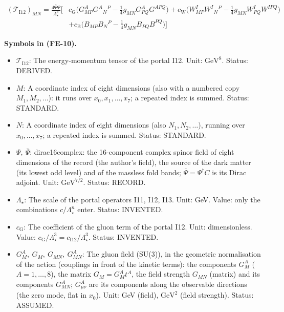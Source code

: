 \documentclass[
  10pt,
]{article}
\providecommand{\tightlist}{%
  \setlength{\itemsep}{0pt}\setlength{\parskip}{0pt}}
\begin{document}
\[
\begin{aligned}
(\mathcal{T}_{\mathrm{I12}})_{MN} =
 \frac{4\bar\Psi\Psi}{\Lambda_\star^3}\Big[&c_{\mathrm{G}}\Big(G^A_{MP}G^A{}_N{}^P
 - \frac14g_{MN}G^A_{PQ}G^{APQ}\Big) + c_{\mathrm{W}}\Big(W^I_{MP}W^I{}_N{}^P -
 \frac14g_{MN}W^I_{PQ}W^{IPQ}\Big)\\
 &+ c_{\mathrm{B}}\Big(B_{MP}B_N{}^P - \frac14g_{MN}B_{PQ}B^{PQ}\Big)\Big]
\end{aligned} \tag{FE-10}
\]

\textbf{Symbols in (FE-10).}

\begin{itemize}
\tightlist
\item
  \(\mathcal{T}_{\mathrm{I12}}\): The energy-momentum tensor of the
  portal I12. Unit: \(\mathrm{GeV}^{8}\). Status: DERIVED.
\item
  \(M\): A coordinate index of eight dimensions (also with a numbered
  copy \(M_1, M_2, \dots\)): it runs over \(x_0, x_1, \dots, x_7\); a
  repeated index is summed. Status: STANDARD.
\item
  \(N\): A coordinate index of eight dimensions (also
  \(N_1, N_2, \dots\)), running over \(x_0, \dots, x_7\); a repeated
  index is summed. Status: STANDARD.
\item
  \(\Psi,\ \bar\Psi\): dirac16complex: the 16-component complex spinor
  field of eight dimensions of the record (the author's field), the
  source of the dark matter (its lowest odd level) and of the massless
  fold bands; \(\bar\Psi = \Psi^\dagger C\) is its Dirac adjoint. Unit:
  \(\mathrm{GeV}^{7/2}\). Status: RECORD.
\item
  \(\Lambda_\star\): The scale of the portal operators I11, I12, I13.
  Unit: GeV. Value: only the combinations \(c/\Lambda_\star^n\) enter.
  Status: INVENTED.
\item
  \(c_{\mathrm{G}}\): The coefficient of the gluon term of the portal
  I12. Unit: dimensionless. Value:
  \(c_{\mathrm{G}}/\Lambda_\star^3 = c_{\mathrm{I12}}/\Lambda_\star^3\).
  Status: INVENTED.
\item
  \(G^A_M,\ G_M,\ G_{MN},\ G^A_{MN}\): The gluon field (SU(3)), in the
  geometric normalisation of the action (couplings in front of the
  kinetic terms): the components \(G^A_M\) (\(A = 1, \dots, 8\)), the
  matrix \(G_M = G^A_Mt^A\), the field strength \(G_{MN}\) (matrix) and
  its components \(G^A_{MN}\); \(G^A_{\mu\nu}\) are its components along
  the observable directions (the zero mode, flat in \(x_0\)). Unit: GeV
  (field), \(\mathrm{GeV}^{2}\) (field strength). Status: ASSUMED.

\end{itemize}
\end{document}
